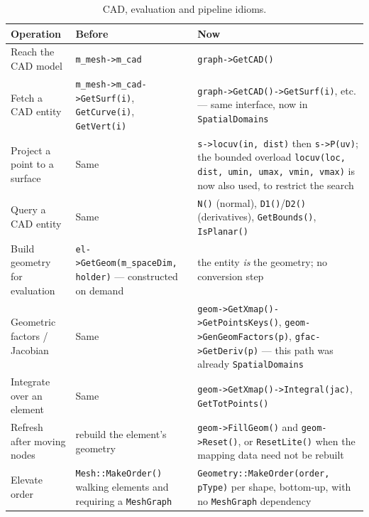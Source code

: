 \begin{table}[h!]
  \centering
  \small
  \begin{tabular}{p{}p{}p{}}
    \hline
    \textbf{Operation} & \textbf{Before} & \textbf{Now}\\
    \hline
    Reach the CAD model &
    \texttt{m\_mesh->m\_cad} &
    \texttt{graph->GetCAD()}\\
    \hline
    Fetch a CAD entity &
    \texttt{m\_mesh->m\_cad->GetSurf(i)},
    \texttt{GetCurve(i)}, \texttt{GetVert(i)} &
    \texttt{graph->GetCAD()->GetSurf(i)}, etc. --- same interface,
    now in \texttt{SpatialDomains}\\
    \hline
    Project a point to a surface &
    Same &
    \texttt{s->locuv(in, dist)} then \texttt{s->P(uv)}; the bounded
    overload \texttt{locuv(loc, dist, umin, umax, vmin, vmax)} is now
    also used, to restrict the search\\
    \hline
    Query a CAD entity &
    Same &
    \texttt{N()} (normal), \texttt{D1()}/\texttt{D2()}
    (derivatives), \texttt{GetBounds()}, \texttt{IsPlanar()}\\
    \hline
    Build geometry for evaluation &
    \texttt{el->GetGeom(m\_spaceDim, holder)} --- constructed on
    demand &
    the entity \textit{is} the geometry; no conversion step\\
    \hline
    Geometric factors / Jacobian &
    Same &
    \texttt{geom->GetXmap()->GetPointsKeys()},
    \texttt{geom->GenGeomFactors(p)}, \texttt{gfac->GetDeriv(p)} ---
    this path was already \texttt{SpatialDomains}\\
    \hline
    Integrate over an element &
    Same &
    \texttt{geom->GetXmap()->Integral(jac)},
    \texttt{GetTotPoints()}\\
    \hline
    Refresh after moving nodes &
    rebuild the element's geometry &
    \texttt{geom->FillGeom()} and \texttt{geom->Reset()}, or
    \texttt{ResetLite()} when the mapping data need not be rebuilt\\
    \hline
    Elevate order &
    \texttt{Mesh::MakeOrder()} walking elements and requiring a
    \texttt{MeshGraph} &
    \texttt{Geometry::MakeOrder(order, pType)} per shape, bottom-up,
    with no \texttt{MeshGraph} dependency\\
    \hline
  \end{tabular}
  \caption{CAD, evaluation and pipeline idioms.}
  \label{tab:ops_cad}
\end{table}


